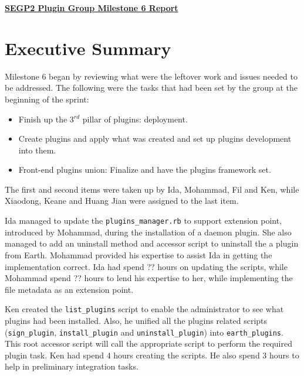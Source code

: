 \documentclass{article}
\begin{document}
\pagestyle{headings}

\begin{center}
{\textbf{\underline{SEGP2 Plugin Group Milestone 6 Report}}}
\end{center}


\section*{Executive Summary}

Milestone 6 began by reviewing what were the leftover work and issues needed to be addressed. The following were the tasks that had been set by the group at the beginning of the sprint:

\begin{itemize}
    \item Finish up the 3$^{rd}$ pillar of plugins: deployment.
    \item Create plugins and apply what was created and set up plugins development into them.
    \item Front-end plugins union: Finalize and have the plugins framework set.
\end{itemize}

The first and second items were taken up by Ida, Mohammad, Fil and Ken, while Xiaodong, Keane and Huang Jian were assigned to the last item. 

Ida managed to update the \texttt{plugins\_manager.rb} to support extension point, introduced by Mohammad, during the installation of a daemon plugin. She also managed to add an uninstall method and accessor script to uninstall the a plugin from Earth. Mohammad provided his expertise to assist Ida in getting the implementation correct. Ida had spend ?? hours on updating the scripts, while Mohammad spend ?? hours to lend his expertise to her, while implementing the file metadata as an extension point. 

Ken created the \texttt{list\_plugins} script to enable the administrator to see what plugins had been installed. Also, he unified all the plugins related scripts (\texttt{sign\_plugin}, \texttt{install\_plugin} and \texttt{uninstall\_plugin}) into \texttt{earth\_plugins}. This root accessor script will call the appropriate script to perform the required plugin task. Ken had spend 4 hours creating the scripts. He also spend 3 hours to help in preliminary integration tasks.
\end{document}
